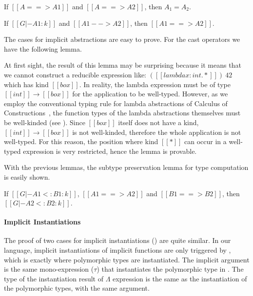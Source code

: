 \begin{lemma}
    If $[[A ==> A1]]$ and $[[A ==> A2]]$,
    then $A_1 = A_2$.
\end{lemma}

\begin{lemma}
    If $[[G |- A1 : k]]$ and $[[A1 --> A2]]$,
    then $[[A1 ==> A2]]$.
\end{lemma}

The cases for implicit abstractions are easy to prove. For the cast operators
we have the following lemma.


At first sight, the result of this lemma may be surprising because it means
that we cannot construct a reducible expression like:
$([[lambda x : int. *]])~42$ which has kind $[[box]]$.
In reality, the lambda expression must be of type $[[int]] \rightarrow [[box]]$
for the application to be well-typed. However, as we employ the conventional
typing rule for lambda abstractions of Calculus of Constructions~\citep{coc},
the function types of the lambda abstractions themselves
must be well-kinded (see ). Since $[[box]]$ itself does not have a kind,
$[[int]] \rightarrow [[box]]$ is not well-kinded, therefore the whole application
is not well-typed. For this reason, the position where kind $[[*]]$ can occur
in a well-typed expression is very restricted, hence the lemma is provable.

With the previous lemmas, the subtype preservation lemma for type computation is easily shown.

\begin{lemma}
    If $[[G |- A1 <: B1 : k]]$, $[[A1 ==> A2]]$ and $[[B1 ==> B2]]$,
    then $[[G |- A2 <: B2 : k]]$.
\end{lemma}

\paragraph{Implicit Instantiations}
The proof of two cases for implicit instantiations ()
are quite similar. In our language, implicit instantiations of implicit functions
are only triggered by , which is exactly where polymorphic types are instantiated.
The implicit argument is the same mono-expression ($\tau$) that
instantiates the polymorphic type in .
The type of the instantiation result of $\Lambda$ expression is the same as the
instantiation of the polymorphic types, with the same argument.

